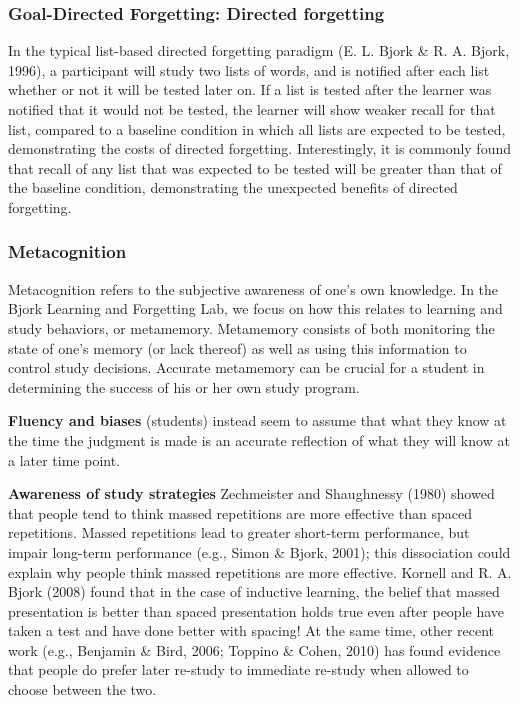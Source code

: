 \subsubsection{Goal-Directed Forgetting: Directed forgetting}
In the typical list-based directed forgetting paradigm (E. L. Bjork \& R. A. Bjork, 1996), a participant will study two lists of words, and is notified after each list whether or not it will be tested later on. If a list is tested after the learner was notified that it would not be tested, the learner will show weaker recall for that list, compared to a baseline condition in which all lists are expected to be tested, demonstrating the costs of directed forgetting. Interestingly, it is commonly found that recall of any list that was expected to be tested will be greater than that of the baseline condition, demonstrating the unexpected benefits of directed forgetting.

\subsubsection{Metacognition}
Metacognition refers to the subjective awareness of one's own knowledge. In the Bjork Learning and Forgetting Lab, we focus on how this relates to learning and study behaviors, or metamemory. Metamemory consists of both monitoring the state of one's memory (or lack thereof) as well as using this information to control study decisions. Accurate metamemory can be crucial for a student in determining the success of his or her own study program.

\textbf{Fluency and biases}
(students) instead seem to assume that what they know at the time the judgment is made is an accurate reflection of what they will know at a later time point.

\textbf{Awareness of study strategies}
 Zechmeister and Shaughnessy (1980) showed that people tend to think massed repetitions are more effective than spaced repetitions. Massed repetitions lead to greater short-term performance, but impair long-term performance (e.g., Simon \& Bjork, 2001); this dissociation could explain why people think massed repetitions are more effective. Kornell and R. A. Bjork (2008) found that in the case of inductive learning, the belief that massed presentation is better than spaced presentation holds true even after people have taken a test and have done better with spacing! At the same time, other recent work (e.g., Benjamin \& Bird, 2006; Toppino \& Cohen, 2010) has found evidence that people do prefer later re-study to immediate re-study when allowed to choose between the two.
